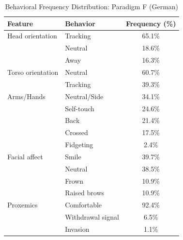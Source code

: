 \begin{table}[ht]
\centering
\caption{Behavioral Frequency Distribution: Paradigm F (German)}
\begin{tabular}{llc}
\toprule
Feature & Behavior & Frequency (\%) \\
\midrule
Head orientation & Tracking & 65.1\% \\
 & Neutral & 18.6\% \\
 & Away & 16.3\% \\
Torso orientation & Neutral & 60.7\% \\
 & Tracking & 39.3\% \\
Arms/Hands & Neutral/Side & 34.1\% \\
 & Self-touch & 24.6\% \\
 & Back & 21.4\% \\
 & Crossed & 17.5\% \\
 & Fidgeting & 2.4\% \\
Facial affect & Smile & 39.7\% \\
 & Neutral & 38.5\% \\
 & Frown & 10.9\% \\
 & Raised brows & 10.9\% \\
Proxemics & Comfortable & 92.4\% \\
 & Withdrawal signal & 6.5\% \\
 & Invasion & 1.1\% \\
\bottomrule
\end{tabular}
\end{table}